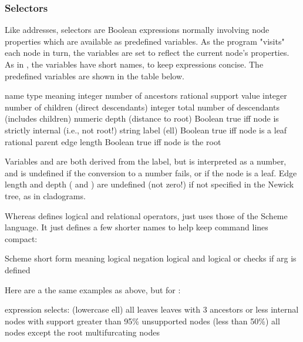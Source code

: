\subsubsection{Selectors}

Like \ed{} addresses, \sched{} selectors are Boolean expressions normally
involving node properties which are available as predefined variables. As the
program "visits" each node in turn, the variables are set to reflect the current
node's properties. As in \ed{}, the variables have short names, to keep
expressions concise. The predefined variables are shown in the table below.

\startalignment[center]
\starttabulate[|c|l|l|]
name \NC type \NC meaning \NC\NR
\HL
{} \NC integer \NC number of ancestors  \NC\NR
{} \NC rational \NC support value \NC\NR
{} \NC integer \NC number of children (direct descendants) \NC\NR
{} \NC integer \NC total number of descendants (includes children) \NC\NR
{} \NC numeric \NC depth (distance to root) \NC\NR
{} \NC Boolean \NC true iff node is strictly internal (i.e., not root!) \NC\NR
{} \NC string \NC label \NC\NR
{} (ell) \NC Boolean \NC true iff node is a leaf \NC\NR
{} \NC rational \NC parent edge length \NC\NR
{} \NC Boolean \NC true iff node is the root
\stoptabulate
\stopalignment

Variables  and  are both derived from the
label, but  is interpreted as a number, and is undefined if the
conversion to a number fails, or if the node is a leaf. Edge length and depth
( and ) are undefined (not zero!) if not specified in the
Newick tree, as in cladograms.

Whereas \ed{} defines logical and relational operators, \sched{} just uses those
of the Scheme language. It just defines a few shorter names to help keep command
lines compact:

\startalignment[center]
\starttabulate[|l|c|l|]
\NC Scheme \NC \sched{} short form \NC meaning \NC\NR
\HL
\NC {} 	\NC \code{!} 	\NC logical negation \NC\NR
\NC {} 	\NC \code{\&} 	\NC logical and \NC\NR
\NC {}  	\NC \code{\|} 	\NC logical or \NC\NR
\NC {} \NC {}	\NC checks if arg is defined  \NC\NR
\stoptabulate
\stopalignment

Here are a the same examples as above, but for \sched:

\startalignment[center]
\starttabulate[|c|l|]
expression \NC selects: \NC\NR
\HL
{} (lowercase ell) \NC all leaves \NC\NR
{} \NC leaves with 3 ancestors or less \NC\NR
{} \NC internal nodes with support greater than 95\% \NC\NR
{} \NC unsupported nodes (less than 50\%) \NC\NR
{} \NC all nodes except the root \NC\NR
{} \NC multifurcating nodes
\stoptabulate
\stopalignment

